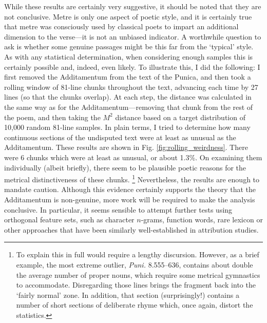 \documentclass[11pt,a4paper]{scrartcl} %
\begin{document}
{While these results are certainly very suggestive, it should be noted that they are not conclusive. Metre is only one aspect of poetic style, and it is certainly true that metre was consciously used by classical poets to impart an additional dimension to the verse---it is not an unbiased indicator. A worthwhile question to ask is whether some genuine passages might be this far from the `typical' style. As with any statistical determination, when considering enough samples this is certainly possible and, indeed, even likely. To illustrate this, I did the following: I first removed the Additamentum from the text of the Punica, and then took a rolling window of 81-line chunks throughout the text, advancing each time by 27 lines (so that the chunks overlap). At each step, the distance was calculated in the same way as for the Additamentum---removing that chunk from the rest of the poem, and then taking the $M^{2}$ distance based on a target distribution of 10,000 random 81-line samples. In plain terms, I tried to determine how many continuous sections of the undisputed text were at least as unusual as the Additamentum. These results are shown in Fig. \ref{fig:rolling_weirdness}. There were 6 chunks which were at least as unusual, or about 1.3\%. On examining them individually (albeit briefly), there seem to be plausible poetic reasons for the metrical distinctiveness of these chunks.%
\footnote{To explain this in full would require a lengthy discursion. However, as a brief example, the most extreme outlier, \textit{Puni.} 8.555--636, contains about double the average number of proper nouns, which require some metrical gymnastics to accommodate. Disregarding those lines brings the fragment back into the `fairly normal' zone. In addition, that section (surprisingly!) contains a number of short sections of deliberate rhyme which, once again, distort the statistics.}
Nevertheless, the results are enough to mandate caution. Although this evidence certainly supports the theory that the Additamentum is non-genuine, more work will be required to make the analysis conclusive. In particular, it seems sensible to attempt further tests using orthogonal feature sets, such as character $n$-grams, function words, rare lexicon or other approaches that have been similarly well-established in attribution studies.

}
\end{document}
